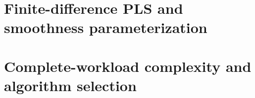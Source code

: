 \documentclass[a4paper,fleqn]{cas-dc}
\newcommand{\1}{\mathbf 1}
\begin{document}


\section{Finite-difference PLS and smoothness parameterization}
\label{sec:foundations}








\section{Complete-workload complexity and algorithm selection}
\label{sec:decision}








\appendix






\end{document}
